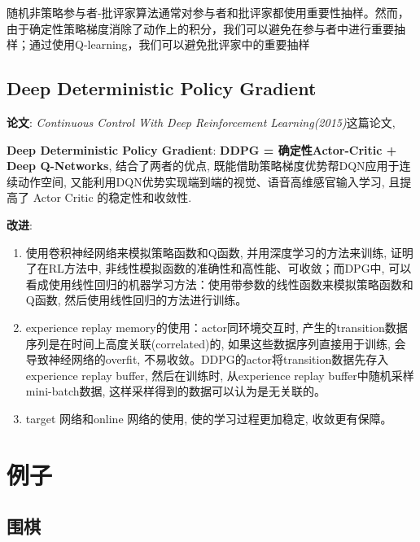 \documentclass{article}
\begin{document}
            随机非策略参与者-批评家算法通常对参与者和批评家都使用重要性抽样。然而，由于确定性策略梯度消除了动作上的积分，我们可以避免在参与者中进行重要抽样；通过使用Q-learning，我们可以避免批评家中的重要抽样
            
        
    \subsection{Deep Deterministic Policy Gradient}
        \textbf{论文}: \textit{Continuous Control With Deep Reinforcement Learning(2015)}这篇论文, 
        
        \textbf{Deep Deterministic Policy Gradient}: \textbf{DDPG = 确定性Actor-Critic + Deep Q-Networks}, 结合了两者的优点, 既能借助策略梯度优势帮DQN应用于连续动作空间, 又能利用DQN优势实现端到端的视觉、语音高维感官输入学习, 且提高了 Actor Critic 的稳定性和收敛性.
        
        \textbf{改进}:
        \begin{enumerate}
            \item 使用卷积神经网络来模拟策略函数和Q函数, 并用深度学习的方法来训练, 证明了在RL方法中, 非线性模拟函数的准确性和高性能、可收敛；而DPG中, 可以看成使用线性回归的机器学习方法：使用带参数的线性函数来模拟策略函数和Q函数, 然后使用线性回归的方法进行训练。
            \item experience replay memory的使用：actor同环境交互时, 产生的transition数据序列是在时间上高度关联(correlated)的, 如果这些数据序列直接用于训练, 会导致神经网络的overfit, 不易收敛。DDPG的actor将transition数据先存入experience replay buffer, 然后在训练时, 从experience replay buffer中随机采样mini-batch数据, 这样采样得到的数据可以认为是无关联的。
            \item target 网络和online 网络的使用,  使的学习过程更加稳定, 收敛更有保障。
        \end{enumerate}
    
   
\section{例子}
    \subsection{围棋}
\end{document}
